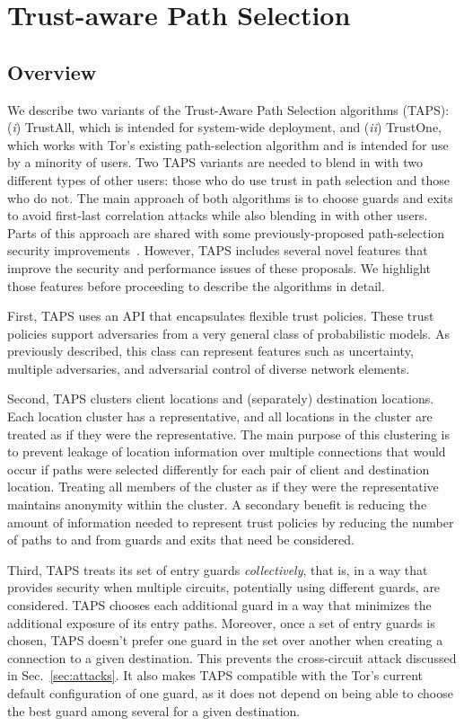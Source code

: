\documentclass[conference]{styles/IEEEtran}
\newcommand{\ps}{TAPS\xspace}
\begin{document}
 \section{Trust-aware Path Selection}\label{sec:alg}
\subsection{Overview}
We describe two variants of the Trust-Aware Path Selection algorithms (\ps): (\emph{i}) TrustAll,
which is intended for system-wide deployment, and (\emph{ii}) TrustOne, which works with Tor's
existing path-selection algorithm and is intended for use by a minority of users.
Two \ps variants are needed to blend in with two different types of other users: those who do use
trust in path selection and those who do not. The main approach of
both algorithms is to choose guards and exits to avoid first-last correlation attacks while
also blending in with other users. Parts of this approach are shared with some previously-proposed
path-selection security improvements~\cite{tor-as,jsdm11ccs,lastor}. However, \ps includes several 
novel features that improve the security and performance issues of these proposals. We highlight
those features before proceeding to describe the algorithms in detail.

First, \ps uses an API that encapsulates flexible trust policies. These trust policies support
adversaries from a very general class of probabilistic models. As previously described, this class
can represent features such as uncertainty, multiple adversaries, and adversarial control of diverse
network elements.

Second, \ps clusters client locations and (separately)
destination locations. Each location cluster has a representative, and all locations in the
cluster are treated as if they were the representative. The main purpose of this clustering is to
prevent leakage of location information over multiple connections that would occur if paths were
selected differently for each pair of client and destination location. Treating all members of the
cluster as if they were the representative maintains anonymity within the cluster.
A secondary benefit is reducing the amount of information
needed to represent trust policies by reducing the number of paths to and from guards and exits
that need be considered.

Third, \ps treats its set of entry guards \emph{collectively}, that is, in a way that provides
security when multiple circuits, potentially using different guards, are considered. \ps chooses
each additional guard in a way that minimizes the additional exposure of
its entry paths. Moreover, once a set of entry guards is chosen, \ps doesn't prefer one guard in the
set over another when creating a connection to a given destination. This prevents the cross-circuit
attack discussed in Sec.~\ref{sec:attacks}. It also makes \ps compatible with the Tor's
current default configuration of one guard, as it does not depend on being able to choose the best
guard among several for a given destination.
\end{document}
